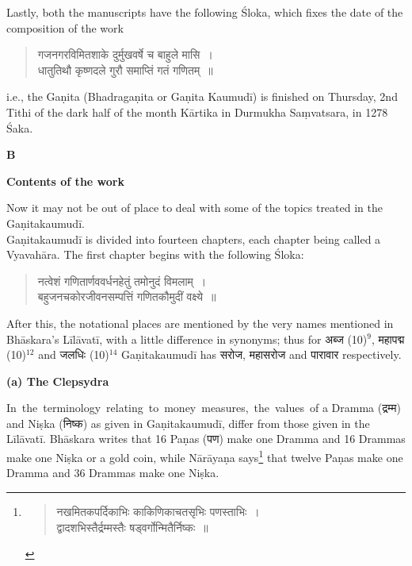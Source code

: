 \documentclass[11pt, openany]{book}
\begin{document}
\vspace{-2mm}
 Lastly, both the manuscripts have the following Śloka, 
which fixes the date of the composition of the work\textemdash\ 
\begin{quote}
    \qt 
     गजनगरविमितशाके दुर्मुखवर्षे च बाहुले मासि~। \\
 धातुतिथौ कृष्णदले गुरौ समाप्तिं गतं गणितम्~॥~
\end{quote}

\noindent i.e., the Gaṇita (Bhadragaṇita or Gaṇita Kaumudī) is finished on Thursday, 2nd Tithi of the dark half of the month Kārtika in Durmukha Saṃvatsara, in 1278 Śaka. 
\vspace{2mm}

\begin{center}
{\large \textbf{B}
\vspace{2mm}
    
\textbf{Contents of the work} }
\end{center}
\vspace{1mm}

 Now it may not be out of place to deal with some of 
the topics treated in the Gaṇitakaumudī. \\

\vspace{-2mm}
 Gaṇitakaumudī is divided into fourteen chapters, each 
chapter being called a Vyavahāra. The first chapter begins 
with the following Śloka:\textemdash\ 
\begin{quote}
    \qt 
    नत्वेशं गणितार्णववर्धनहेतुं तमोनुदं विमलाम्~। \\
 बहुजनचकोरजीवनसम्पत्तिं गणितकौमुदीं वक्ष्ये~॥~
\end{quote}
 
 After this, the notational places are mentioned by the very 
names mentioned in Bhāskara's Līlāvatī, with a little difference 
in synonyms; thus for अब्ज (10)$^9$, महापद्म (10)$^{12}$ and जलधिः (10)$^{14}$ Gaṇitakaumudī has सरोज, महासरोज and पारावार respectively. 
\newpage
\begin{center}
    \textbf{(a) The Clepsydra}
\end{center}

 In \,the \,terminology \,relating \,to \,money \,measures, \,the \,values 
\,of a Dramma (द्रम्म) and Niṣka (निष्क) as given in Gaṇitakaumudī, 
differ from those given in the Līlāvatī. Bhāskara writes that 
16 Paṇas (पण) make one Dramma and 16 Drammas make one 
Niṣka or a gold coin, while Nārāyaṇa says\renewcommand{\thefootnote}{5}\footnote{
\vspace{-4mm}
 \begin{quote}
    \qt
नखमितकपर्दिकाभिः काकिणिकाचतसृभिः पणस्ताभिः~। \\
द्वादशभिस्तैर्द्रम्मस्तैः षड्वर्गोन्मितैर्निष्कः~॥~
\end{quote}} that twelve Paṇas 
make one Dramma and $36$ Drammas make one Niṣka.\\
\end{document}
